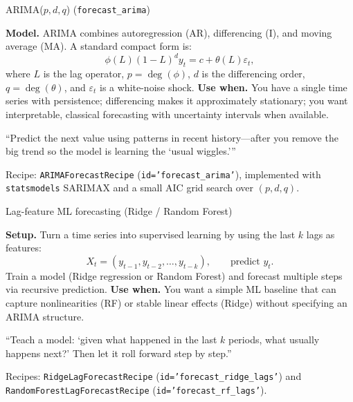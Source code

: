 \documentclass[11pt]{article}
\begin{document}
\begin{ConceptBox}{ARIMA(\(p,d,q\)) (\texttt{forecast\_arima})}
\begin{ClassroomBox}
\textbf{Model.} ARIMA combines autoregression (AR), differencing (I), and moving average (MA). A standard compact form is:
\[
\phi(L)(1-L)^d y_t = c + \theta(L)\varepsilon_t,
\]
where \(L\) is the lag operator, \(p=\deg(\phi)\), \(d\) is the differencing order, \(q=\deg(\theta)\), and \(\varepsilon_t\) is a white-noise shock.
\textbf{Use when.} You have a single time series with persistence; differencing makes it approximately stationary; you want interpretable, classical forecasting with uncertainty intervals when available.
\end{ClassroomBox}
\begin{IntuitionBox}
“Predict the next value using patterns in recent history—after you remove the big trend so the model is learning the ‘usual wiggles.’”
\end{IntuitionBox}
\begin{WhereBox}
Recipe: \texttt{ARIMAForecastRecipe} (\texttt{id='forecast\_arima'}), implemented with \texttt{statsmodels} SARIMAX and a small AIC grid search over \((p,d,q)\).
\end{WhereBox}
\end{ConceptBox}

\begin{ConceptBox}{Lag-feature ML forecasting (Ridge / Random Forest)}
\begin{ClassroomBox}
\textbf{Setup.} Turn a time series into supervised learning by using the last \(k\) lags as features:
\[
X_t = (y_{t-1},y_{t-2},\dots,y_{t-k}), \qquad \text{predict } y_t.
\]
Train a model (Ridge regression or Random Forest) and forecast multiple steps via recursive prediction.
\textbf{Use when.} You want a simple ML baseline that can capture nonlinearities (RF) or stable linear effects (Ridge) without specifying an ARIMA structure.
\end{ClassroomBox}
\begin{IntuitionBox}
“Teach a model: ‘given what happened in the last \(k\) periods, what usually happens next?’ Then let it roll forward step by step.”
\end{IntuitionBox}
\begin{WhereBox}
Recipes: \texttt{RidgeLagForecastRecipe} (\texttt{id='forecast\_ridge\_lags'}) and \texttt{RandomForestLagForecastRecipe} (\texttt{id='forecast\_rf\_lags'}).
\end{WhereBox}
\end{ConceptBox}
\end{document}
